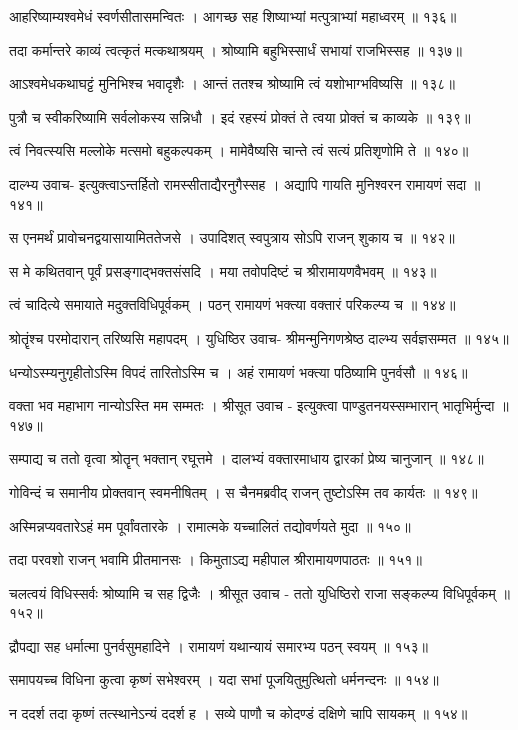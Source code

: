 आहरिष्याम्यश्वमेधं स्वर्णसीतासमन्वितः ।
आगच्छ सह शिष्याभ्यां मत्पुत्राभ्यां महाध्वरम् ॥ १३६॥

तदा कर्मान्तरे काव्यं त्वत्कृतं मत्कथाश्रयम् ।
श्रोष्यामि बहुभिस्सार्धं सभायां राजभिस्सह ॥ १३७॥

आऽश्वमेधकथाघट्टं मुनिभिश्च भवादृशैः ।
आन्तं ततश्च श्रोष्यामि त्वं यशोभाग्भविष्यसि ॥ १३८॥

पुत्रौ च स्वीकरिष्यामि सर्वलोकस्य सन्निधौ ।
इदं रहस्यं प्रोक्तं ते त्वया प्रोक्तं च काव्यके ॥ १३९॥

त्वं निवत्स्यसि मल्लोके मत्समो बहुकल्पकम् ।
मामेवैष्यसि चान्ते त्वं सत्यं प्रतिश‍ृणोमि ते ॥ १४०॥

दाल्भ्य उवाच-
इत्युक्त्वाऽन्तर्हितो रामस्सीताद्यैरनुगैस्सह ।
अद्यापि गायति मुनिश्वरन रामायणं सदा ॥ १४१॥

स एनमर्थं प्रावोचनद्वयासायामिततेजसे ।
उपादिशत् स्वपुत्राय सोऽपि राजन् शुकाय च ॥ १४२॥

स मे कथितवान् पूर्वं प्रसङ्गाद्भक्तसंसदि ।
मया तवोपदिष्टं च श्रीरामायणवैभवम् ॥ १४३॥

त्वं चादित्ये समायाते मदुक्तविधिपूर्वकम् ।
पठन् रामायणं भक्त्या वक्तारं परिकल्प्य च ॥ १४४॥

श्रोतॄंश्च परमोदारान् तरिष्यसि महापदम् ।
युधिष्ठिर उवाच-
श्रीमन्मुनिगणश्रेष्ठ दाल्भ्य सर्वज्ञसम्मत ॥ १४५॥

धन्योऽस्म्यनुगृहीतोऽस्मि विपदं तारितोऽस्मि च ।
अहं रामायणं भक्त्या पठिष्यामि पुनर्वसौ ॥ १४६॥

वक्ता भव महाभाग नान्योऽस्ति मम सम्मतः ।
श्रीसूत उवाच -
इत्युक्त्वा पाण्डुतनयस्सम्भारान् भातृभिर्मुन्दा ॥ १४७॥

सम्पाद्य च ततो वृत्वा श्रोतॄन् भक्तान् रघूत्तमे ।
दालभ्यं वक्तारमाधाय द्वारकां प्रेष्य चानुजान् ॥ १४८॥

गोविन्दं च समानीय प्रोक्तवान् स्वमनीषितम् ।
स चैनमब्रवीद् राजन् तुष्टोऽस्मि तव कार्यतः ॥ १४९॥

अस्मिन्नप्यवतारेऽहं मम पूर्वांवतारके ।
रामात्मके यच्चालितं तद्योवर्णयते मुदा ॥ १५०॥

तदा परवशो राजन् भवामि प्रीतमानसः ।
किमुताऽद्य महीपाल श्रीरामायणपाठतः ॥ १५१॥

चलत्वयं विधिस्सर्वः श्रोष्यामि च सह द्विजैः ।
श्रीसूत उवाच -
ततो युधिष्ठिरो राजा सङ्कल्प्य विधिपूर्वकम् ॥ १५२॥

द्रौपद्या सह धर्मात्मा पुनर्वसुमहादिने ।
रामायणं यथान्यायं समारभ्य पठन् स्वयम् ॥ १५३॥

समापयच्च विधिना कुत्वा कृष्णं सभेश्वरम् ।
यदा सभां पूजयितुमुत्थितो धर्मनन्दनः ॥ १५४॥

न ददर्श तदा कृष्णं तत्स्थानेऽन्यं ददर्श ह ।
सव्ये पाणौ च कोदण्डं दक्षिणे चापि सायकम् ॥ १५४॥

